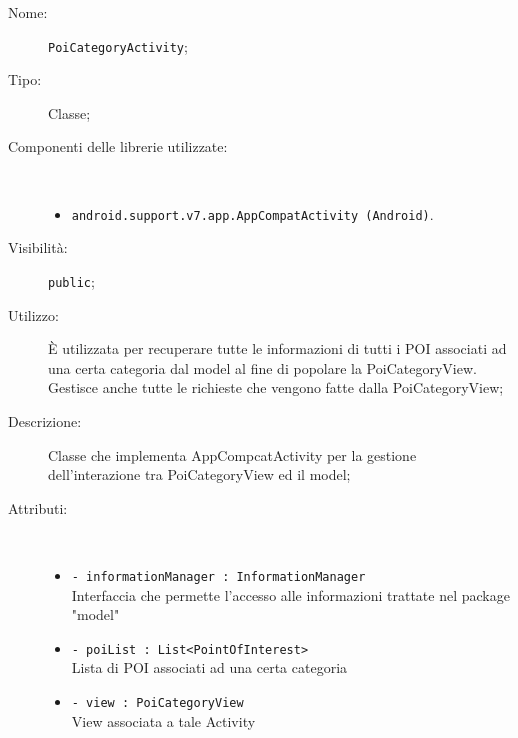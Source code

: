 \documentclass[../DefinizioneDiProdotto.tex]{subfiles}
\begin{document}
\begin{description}
	\item[Nome:] \texttt{PoiCategoryActivity};
	\item[Tipo:] Classe;
	\item[Componenti delle librerie utilizzate:] \
	\begin{itemize}
		\item \texttt{android.support.v7.app.AppCompatActivity (Android)}.
		
	\end{itemize}
	\item[Visibilità:] \texttt{public};
	\item[Utilizzo:] È utilizzata per recuperare tutte le informazioni di tutti i POI associati ad una certa categoria dal model al fine di popolare la PoiCategoryView. Gestisce anche tutte le richieste che vengono fatte dalla PoiCategoryView;
	\item[Descrizione:] Classe che implementa AppCompcatActivity per la gestione dell'interazione tra PoiCategoryView ed il model;
	\item[Attributi:] \
	\begin{itemize}
		\item \texttt{- informationManager : InformationManager}\\
		Interfaccia che permette l'accesso alle informazioni trattate nel package "model"
		
		\item \texttt{- poiList : List<PointOfInterest>}\\
		Lista di POI associati ad una certa categoria
		
		\item \texttt{- view : PoiCategoryView}\\
		View associata a tale Activity
		

\end{itemize}
\end{description}
\end{document}
